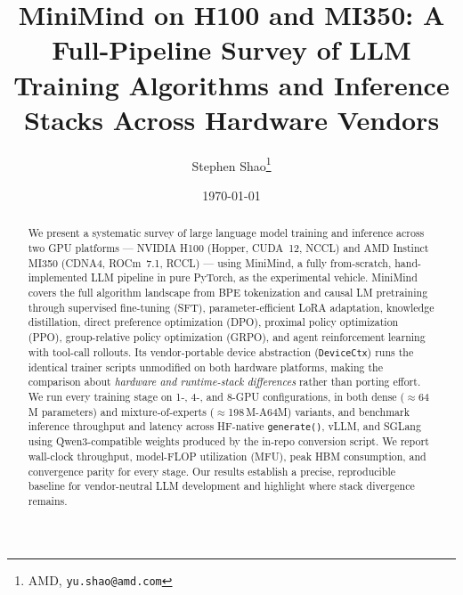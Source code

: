 \documentclass[11pt]{article}
\title{\textbf{MiniMind on H100 and MI350: A Full-Pipeline Survey of LLM\\
Training Algorithms and Inference Stacks Across Hardware Vendors}}
\author{Stephen Shao\thanks{AMD, \texttt{yu.shao@amd.com}}
\and \PH{co-authors}}
\date{\today}
\begin{document}
\maketitle

\begin{abstract}
We present a systematic survey of large language model training and inference
across two GPU platforms — NVIDIA H100 (Hopper, CUDA~12, NCCL) and AMD Instinct
MI350 (CDNA4, ROCm~7.1, RCCL) — using MiniMind, a fully from-scratch,
hand-implemented LLM pipeline in pure PyTorch, as the experimental vehicle.
MiniMind covers the full algorithm landscape from BPE tokenization and causal LM
pretraining through supervised fine-tuning (SFT), parameter-efficient LoRA
adaptation, knowledge distillation, direct preference optimization (DPO),
proximal policy optimization (PPO), group-relative policy optimization (GRPO),
and agent reinforcement learning with tool-call rollouts.  Its vendor-portable
device abstraction (\texttt{DeviceCtx}) runs the identical trainer scripts
unmodified on both hardware platforms, making the comparison about
\emph{hardware and runtime-stack differences} rather than porting effort.
We run every training stage on 1-, 4-, and 8-GPU configurations, in both dense
($\approx$64\,M parameters) and mixture-of-experts ($\approx$198\,M-A64M)
variants, and benchmark inference throughput and latency across HF-native
\texttt{generate()}, vLLM, and SGLang using Qwen3-compatible weights produced
by the in-repo conversion script.  We report wall-clock throughput,
model-FLOP utilization (MFU), peak HBM consumption, and convergence parity for
every stage.  Our results establish a precise, reproducible baseline for
vendor-neutral LLM development and highlight where stack divergence remains.
\end{abstract}

\tableofcontents
\newpage














\end{document}
